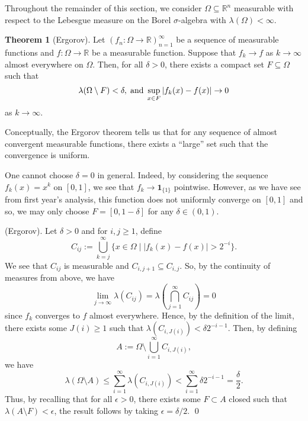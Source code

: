 \documentclass[
]{article}
\theoremstyle{definition}
\newtheorem{theorem}{Theorem}
\theoremstyle{definition}
\begin{document}
Throughout the remainder of this section, we consider
\(\Omega \subseteq \mathbb{R}^n\) measurable with respect to the
Lebesgue measure on the Borel \(\sigma\)-algebra with
\(\lambda(\Omega) < \infty\).

\begin{theorem}[Ergorov]
  Let \((f_n : \Omega \to \mathbb{R})_{n = 1}^\infty\) be a sequence of 
  measurable functions and \(f : \Omega \to \mathbb{R}\) be a measurable 
  function. Suppose that \(f_k \to f\) as \(k \to \infty\) almost everywhere 
  on \(\Omega\). Then, for all \(\delta > 0\), there exists a compact set 
  \(F \subseteq \Omega\) such that 
  \[\lambda(\Omega \setminus F) < \delta, \hspace{1mm} \text{and} \hspace{1mm} 
    \sup_{x \in F} |f_k(x) - f(x)| \to 0\]
  as \(k \to \infty\).
\end{theorem}

Conceptually, the Ergorov theorem tells us that for any sequence of
almost convergent measurable functions, there exists a ``large'' set
such that the convergence is uniform.

One cannot choose \(\delta = 0\) in general. Indeed, by considering the
sequence \(f_k(x) = x^k\) on \([0, 1]\), we see that
\(f_k \to \mathbf{1}_{\{1\}}\) pointwise. However, as we have see from
first year's analysis, this function does not uniformly converge on
\([0, 1]\) and so, we may only choose \(F = [0, 1 - \delta]\) for any
\(\delta \in (0, 1)\).

\proof (Ergorov). Let \(\delta > 0\) and for \(i, j \ge 1\), define
\[C_{ij} := \bigcup_{k = j}^\infty \{x \in \Omega \mid | f_k(x) - f(x)| > 2^{-i}\}.\]
We see that \(C_{ij}\) is measurable and
\(C_{i, j + 1} \subseteq C_{i, j}\). So, by the continuity of measures
from above, we have \[\lim_{j \to \infty} \lambda(C_{ij}) = 
    \lambda\left(\bigcap_{j = 1}^\infty C_{ij}\right) = 0\] since
\(f_k\) converges to \(f\) almost everywhere. Hence, by the definition
of the limit, there exists some \(J(i) \ge 1\) such that
\(\lambda(C_{i, J(i)}) <  \delta 2^{-i - 1}\). Then, by defining
\[A := \Omega \setminus \bigcup_{i = 1}^\infty C_{i, J(i)},\] we have
\[\lambda(\Omega \setminus A) \le \sum_{i = 1}^\infty \lambda(C_{i, J(i)})
    < \sum_{i = 1}^\infty \delta 2^{-i - 1} = \frac{\delta}{2}.\] Thus,
by recalling that for all \(\epsilon > 0\), there exists some
\(F \subset A\) closed such that \(\lambda(A \setminus F) < \epsilon\),
the result follows by taking \(\epsilon = \delta / 2\). \qed
\end{document}
